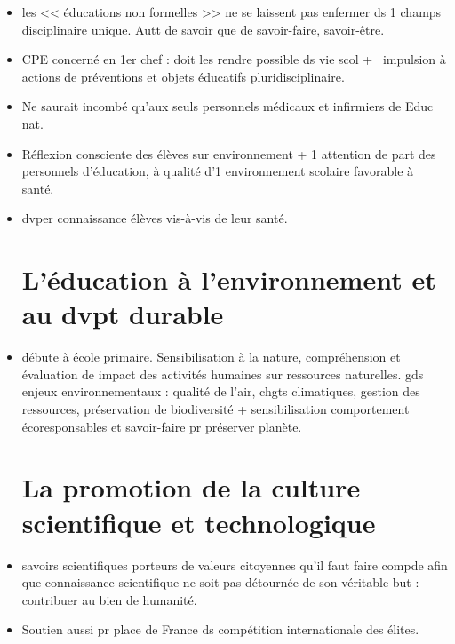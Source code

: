 \documentclass[12pt]{report}
\begin{document}
\begin{itemize}
\item les << éducations non formelles >> ne se laissent pas enfermer ds 1 champs disciplinaire unique. Autt de savoir que de savoir-faire, savoir-être. \\

\item CPE concerné en 1er chef : doit les rendre possible ds vie scol + \ impulsion à actions de préventions et objets éducatifs pluridisciplinaire.\\

\item Ne saurait incombé qu'aux seuls personnels médicaux et infirmiers de Educ nat. \\

\item Réflexion consciente des élèves sur environnement + 1 attention de part des personnels d'éducation, à qualité d'1 environnement scolaire favorable à santé. \\

\item dvper connaissance élèves vis-à-vis de leur santé. \\

\section{L'éducation à l'environnement et au dvpt durable}

\item débute à école primaire. Sensibilisation à la nature, compréhension et évaluation de impact des activités humaines sur ressources naturelles. gds enjeux environnementaux : qualité de l'air, chgts climatiques, gestion des ressources, préservation de biodiversité + sensibilisation comportement écoresponsables et savoir-faire pr préserver planète. \\

\section{La promotion de la culture scientifique et technologique}


\item savoirs scientifiques porteurs de valeurs citoyennes qu'il faut faire compde afin que connaissance scientifique ne soit pas détournée de son véritable but : contribuer au bien de humanité. \\

\item Soutien aussi pr place de France ds compétition internationale des élites.\\


\end{itemize}
\end{document}
